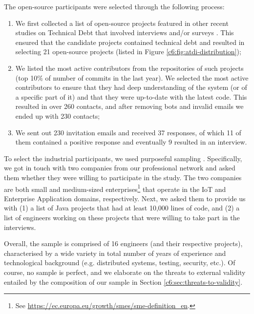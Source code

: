 The open-source participants were selected through the following process:
\begin{enumerate}
    \item We first collected a list of open-source projects featured in other recent studies on Technical Debt that involved interviews and/or surveys \cite{Tan2021,Maldonado2017,Zampetti2021}. This ensured that the candidate projects contained technical debt and resulted in selecting 21 open-source projects (listed in Figure \ref{c6:fig:atdi-distribution});
    \item We listed the most active contributors from the repositories of such projects (top 10\% of number of commits in the last year). We selected the most active contributors to ensure that they had deep understanding of the system (or of a specific part of it) and that they were up-to-date with the latest code. 
    This resulted in over 260 contacts, and after removing bots and invalid emails we ended up with 230 contacts;
    \item We sent out 230 invitation emails and received 37 responses, of which 11 of them contained a positive response and eventually 9 resulted in an interview.
\end{enumerate}

To select the industrial participants, we used purposeful sampling \cite{Palinkas2015}. Specifically, we got in touch with two companies from our professional network and asked them whether they were willing to participate in the study. 
The two companies are both small and medium-sized enterprises\footnote{See \url{https://ec.europa.eu/growth/smes/sme-definition_en}.} that operate in the IoT and Enterprise Application domains, respectively.
Next, we asked them to provide us with (1) a list of Java projects that had at least 10,000 lines of code, and (2) a list of engineers working on these projects that were willing to take part in the interviews.

Overall, the sample is comprised of 16 engineers (and their respective projects), characterised by a wide variety in total number of years of experience and technological background (e.g. distributed systems, testing, security, etc.).
Of course, no sample is perfect, and we elaborate on the threats to external validity entailed by the composition of our sample in Section \ref{c6:sec:threats-to-validity}.

